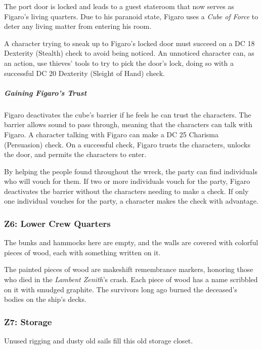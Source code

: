 \documentclass[10pt,a4paper,twoside,bg=print,twocolumn,openany,nodeprecatedcode]{dndbook}
\begin{document}
The port door is locked and leads to a guest stateroom that now serves as Figaro's living quarters. Due to his paranoid state, Figaro uses a \textit{Cube of Force} to deter any living matter from entering his room.

A character trying to sneak up to Figaro's locked door must succeed on a DC 18 Dexterity (Stealth) check to avoid being noticed. An unnoticed character can, as an action, use thieves' tools to try to pick the door's lock, doing so with a successful DC 20 Dexterity (Sleight of Hand) check.

\subparagraph{Gaining Figaro's Trust}
Figaro deactivates the cube's barrier if he feels he can trust the characters. The barrier allows sound to pass through, meaning that the characters can talk with Figaro. A character talking with Figaro can make a DC 25 Charisma (Persuasion) check. On a successful check, Figaro trusts the characters, unlocks the door, and permits the characters to enter.

By helping the people found throughout the wreck, the party can find individuals who will vouch for them. If two or more individuals vouch for the party, Figaro deactivates the barrier without the characters needing to make a check. If only one individual vouches for the party, a character makes the check with advantage.

\subsubsection{Z6: Lower Crew Quarters}
\begin{DndReadAloud}{}
The bunks and hammocks here are empty, and the walls are covered with colorful pieces of wood, each with something written on it.

\end{DndReadAloud}

The painted pieces of wood are makeshift remembrance markers, honoring those who died in the \textit{Lambent Zenith}'s crash. Each piece of wood has a name scribbled on it with smudged graphite. The survivors long ago burned the deceased's bodies on the ship's decks.

\subsubsection{Z7: Storage}
\begin{DndReadAloud}{}
Unused rigging and dusty old sails fill this old storage closet.

\end{DndReadAloud}
\end{document}

